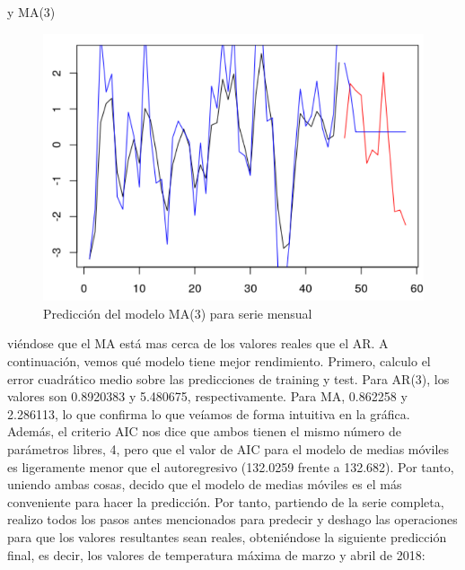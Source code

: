y MA(3)

\begin{figure}[H] %
	\centering
	\includegraphics[scale=0.31]{pred-ma013-mensual.png}  %
	\caption{Predicción del modelo MA(3) para serie mensual} 
	\label{fig:ma013}
\end{figure}
 
viéndose que el MA está mas cerca de los valores reales que el AR. A continuación, vemos qué modelo tiene mejor rendimiento. Primero, calculo el error cuadrático medio sobre las predicciones de training y test. Para AR(3), los valores son 0.8920383 y 5.480675, respectivamente. Para MA, 0.862258 y 2.286113, lo que confirma lo que veíamos de forma intuitiva en la gráfica. Además, el criterio AIC nos dice que ambos tienen el mismo número de parámetros libres, 4, pero que el valor de AIC para el modelo de medias móviles es ligeramente menor que el autoregresivo (132.0259 frente a 132.682). Por tanto, uniendo ambas cosas, decido que el modelo de medias móviles es el más conveniente para hacer la predicción. Por tanto, partiendo de la serie completa, realizo todos los pasos antes mencionados para predecir y deshago las operaciones para que los valores resultantes sean reales, obteniéndose la siguiente predicción final, es decir, los valores de temperatura máxima de marzo y abril de 2018:

